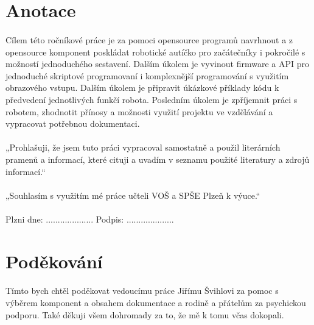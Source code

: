 \documentclass{article}
\begin{document}
	
	\thispagestyle{empty}
	
	\newpage
	\thispagestyle{empty}
	\section*{Anotace}
	\paragraph{} Cílem této ročníkové práce je za pomoci opensource programů navrhnout a z opensource komponent poskládat robotické autíčko pro začátečníky i pokročilé s možností jednoduchého sestavení. Dalším úkolem je vyvinout firmware a API pro jednoduché skriptové programovaní i komplexnější programování s využitím obrazového vstupu. Dalším úkolem je připravit úkázkové příklady kódu k předvedení jednotlivých funkčí robota. Posledním úkolem je zpříjemnit práci s robotem, zhodnotit přínosy a možnosti využití projektu ve vzdělávání a vypracovat potřebnou dokumentaci.
	\vfill
	\paragraph{} „Prohlašuji, že jsem tuto práci vypracoval samostatně a použil literárních pramenů a informací, které cituji a uvadím v seznamu použité literatury a zdrojů informací.“
	\paragraph{} „Souhlasím s využitím mé práce učteli VOŠ a SPŠE Plzeň k výuce.“
	\paragraph{} \hfill Plzni dne: .................... Podpis: ....................
	
	\newpage
	\thispagestyle{empty}
	\section*{Poděkování}
	\paragraph{} Tímto bych chtěl poděkovat vedoucímu práce Jiřímu Švihlovi za pomoc s výběrem komponent a obsahem dokumentace a rodině a přátelům za psychickou podporu. Také děkuji všem dohromady za to, že mě k tomu včas dokopali.
	
\end{document}
